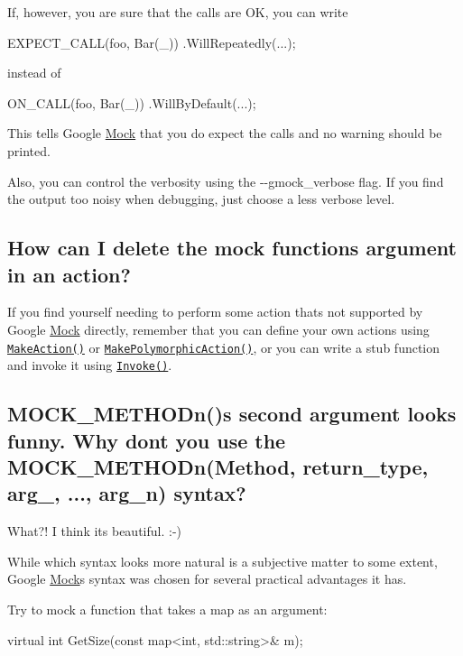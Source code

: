 If, however, you are sure that the calls are OK, you can write


\begin{DoxyCode}
EXPECT\_CALL(foo, Bar(\_))
    .WillRepeatedly(...);
\end{DoxyCode}


instead of


\begin{DoxyCode}
ON\_CALL(foo, Bar(\_))
    .WillByDefault(...);
\end{DoxyCode}


This tells Google \hyperlink{classMock}{Mock} that you do expect the calls and no warning should be printed.

Also, you can control the verbosity using the {\ttfamily -\/-\/gmock\+\_\+verbose} flag. If you find the output too noisy when debugging, just choose a less verbose level.

\subsection*{How can I delete the mock function\textquotesingle{}s argument in an action?}

If you find yourself needing to perform some action that\textquotesingle{}s not supported by Google \hyperlink{classMock}{Mock} directly, remember that you can define your own actions using \href{CookBook.md#writing-new-actions-quickly}{\tt Make\+Action()} or \href{CookBook.md#writing-new-polymorphic-actions}{\tt Make\+Polymorphic\+Action()}, or you can write a stub function and invoke it using \href{CookBook.md#using-functionsmethodsfunctors-as-actions}{\tt Invoke()}.

\subsection*{M\+O\+C\+K\+\_\+\+M\+E\+T\+H\+O\+Dn()\textquotesingle{}s second argument looks funny. Why don\textquotesingle{}t you use the M\+O\+C\+K\+\_\+\+M\+E\+T\+H\+O\+Dn(Method, return\+\_\+type, arg\+\_, ..., arg\+\_\+n) syntax?}

What?! I think it\textquotesingle{}s beautiful. \+:-\/)

While which syntax looks more natural is a subjective matter to some extent, Google \hyperlink{classMock}{Mock}\textquotesingle{}s syntax was chosen for several practical advantages it has.

Try to mock a function that takes a map as an argument\+: 
\begin{DoxyCode}
\textcolor{keyword}{virtual} \textcolor{keywordtype}{int} GetSize(\textcolor{keyword}{const} map<int, std::string>& m);
\end{DoxyCode}


